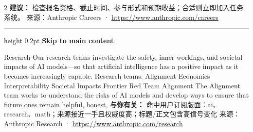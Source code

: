 \documentclass[10.5pt]{ctexart}
\begin{document}
\begin{multicols}{2}
\textbf{建议：} 检查报名资格、截止时间、参与形式和预期收益；合适则立即加入任务系统。
{\footnotesize\color{ormuted} 来源：Anthropic Careers · \url{https://www.anthropic.com/careers}}
\vspace{2mm}
\hrule height 0.2pt
\vspace{2mm}
{\large\bfseries Skip to main content}\par
Research Our research teams investigate the safety, inner workings, and societal impacts of AI models—so that artificial intelligence has a positive impact as it becomes increasingly capable. Research teams: Alignment Economics Interpretability Societal Impacts Frontier Red Team Alignment The Alignment team works to understand the risks of AI models and develop ways to ensure that future ones remain helpful, honest, 
\textbf{与你有关：} 命中用户订阅版面：ai、research、math；来源接近一手且权威度高；标题/正文包含高信号变化
{\footnotesize\color{ormuted} 来源：Anthropic Research · \url{https://www.anthropic.com/research}}
\end{multicols}
\end{document}
